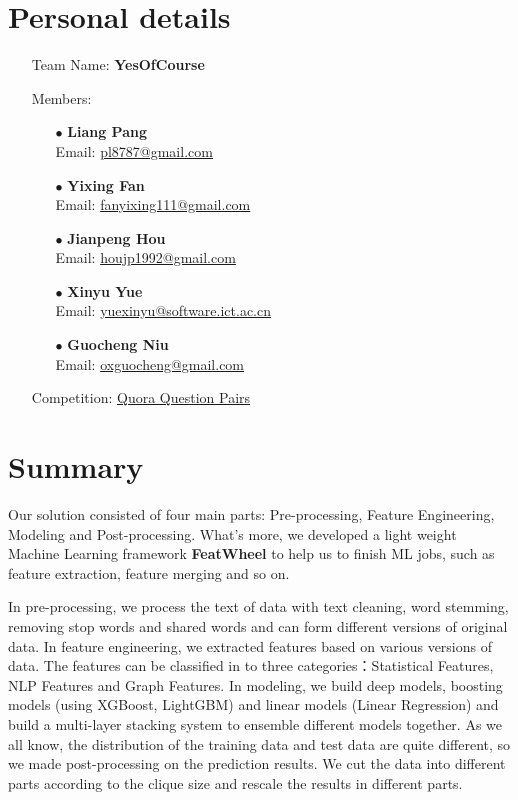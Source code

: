 \documentclass[12pt]{article}
\begin{document}
\section*{Personal details}
\begin{itemize}
\item[] Team Name: \textbf{YesOfCourse}
\item[] Members:
\begin{itemize}
\item[$\bullet$] \textbf{Liang Pang} \\
	Email: \url{pl8787@gmail.com}
\item[$\bullet$] \textbf{Yixing Fan} \\
	Email: \url{fanyixing111@gmail.com}
\item[$\bullet$] \textbf{Jianpeng Hou} \\
	Email: \url{houjp1992@gmail.com}
\item[$\bullet$] \textbf{Xinyu Yue} \\
	Email: \url{yuexinyu@software.ict.ac.cn}
\item[$\bullet$] \textbf{Guocheng Niu} \\
	Email: \url{oxguocheng@gmail.com}
\end{itemize}
\item[] Competition: \href{https://www.kaggle.com/c/quora-question-pairs/}{Quora Question Pairs}
\end{itemize}

\newpage
\tableofcontents

\newpage


\section{Summary}

Our solution consisted of four main parts: Pre-processing, Feature Engineering, Modeling and Post-processing. What's more, we developed a light weight Machine Learning framework \textbf{FeatWheel} to help us to finish ML jobs, such as feature extraction, feature merging and so on.

In pre-processing, we process the text of data with text cleaning, word stemming, removing stop words and shared words and can form different versions of original data. In feature engineering, we extracted features based on various versions of data. The features can be classified in to three categories：Statistical Features, NLP Features and Graph Features. In modeling, we build deep models, boosting models (using XGBoost, LightGBM) and linear models (Linear Regression) and build a multi-layer stacking system to ensemble different models together. As we all know, the distribution of the training data and test data are quite different, so we made post-processing on the prediction results. We cut the data into different parts according to the clique size and rescale the results in different parts. 
\end{document}
